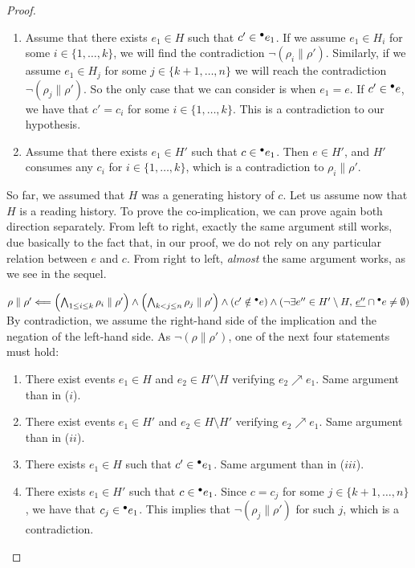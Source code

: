 \documentclass[12pt,a4paper]{article}
\begin{document}
\begin{proof}
\begin{enumerate}[$i$.]
\item Assume that there exists $e_1 \in H$ such that $c' \in {}^\bullet e_1$.  If we
assume $e_1 \in H_i$ for some $i \in \{1, \ldots, k\}$, we will find the
contradiction $\lnot (\rho_i \parallel \rho')$.  Similarly, if we assume $e_1
\in H_j$ for some $j \in \{k+1, \ldots, n\}$ we will reach the
contradiction $\lnot (\rho_j \parallel \rho')$.  So the only case that we
can consider is when $e_1 = e$.  If $c' \in {}^\bullet e$, we have that $c' = c_i$
for some $i \in \{1, \ldots, k\}$.  This is a contradiction to our hypothesis.

\item Assume that there exists $e_1 \in H'$ such that $c \in {}^\bullet e_1$.  Then
$e \in H'$, and $H'$ consumes any $c_i$ for $i \in \{1, \ldots, k\}$, which is
a contradiction to $\rho_i \parallel \rho'$.
\end{enumerate}

So far, we assumed that $H$ was a generating history of $c$.  Let us assume now
that $H$ is a reading history.  To prove the co-implication, we can prove again
both direction separately.  From left to right, exactly the same argument still
works, due basically to the fact that, in our proof, we do not rely on any
particular relation between $e$ and $c$.  From right to left, \emph{almost} the
same argument works, as we see in the sequel.

\item $\rho \parallel \rho' \Longleftarrow
\left ( \bigwedge_{1 \le i \le k} \rho_i \parallel \rho' \right ) \land 
\left ( \bigwedge_{k < j \le n} \rho_j \parallel \rho' \right ) \land 
\left ( c' \notin {}^\bullet e \right ) \land
\left ( \lnot \exists e'' \in H' \setminus H,\, \underline{e''} \cap {}^\bullet e \ne
\emptyset \right )$ By contradiction, we assume the right-hand side of the
implication and the negation of the left-hand side.  As $\lnot (\rho \parallel
\rho')$, one of the next four statements must hold:

\begin{enumerate}[1.]
\item There exist events $e_1 \in H$ and $e_2 \in H' \setminus H$ verifying
$e_2 \nearrow e_1$.  Same argument than in ($i$).

\item There exist events $e_1 \in H'$ and $e_2 \in H \setminus H'$ verifying
$e_2 \nearrow e_1$.  Same argument than in ($ii$).

\item There exists $e_1 \in H$ such that $c' \in {}^\bullet e_1$.  Same argument
than in ($iii$).

\item There exists $e_1 \in H'$ such that $c \in {}^\bullet e_1$.  Since $c = c_j$
for some $j \in \{k+1, \ldots, n\}$, we have that $c_j \in {}^\bullet e_1$.  This
implies that $\lnot (\rho_j \parallel \rho')$ for such $j$, which is a
contradiction.
\end{enumerate}
\end{proof}
\end{document}
